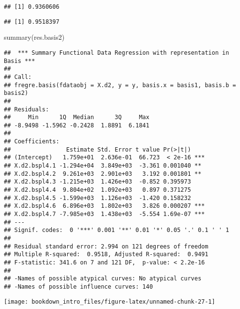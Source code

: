 \documentclass[
]{book}
\newenvironment{Shaded}{\begin{snugshade}}{\end{snugshade}}
\newcommand{\AttributeTok}[1]{\textcolor[rgb]{0.77,0.63,0.00}{#1}}
\newcommand{\DecValTok}[1]{\textcolor[rgb]{0.00,0.00,0.81}{#1}}
\newcommand{\FunctionTok}[1]{\textcolor[rgb]{0.00,0.00,0.00}{#1}}
\newcommand{\NormalTok}[1]{#1}
\newcommand{\SpecialCharTok}[1]{\textcolor[rgb]{0.00,0.00,0.00}{#1}}
\begin{document}
\begin{verbatim}
## [1] 0.9360606
\end{verbatim}

\begin{verbatim}
## [1] 0.9518397
\end{verbatim}

\begin{Shaded}
\begin{Highlighting}[]
\FunctionTok{summary}\NormalTok{(res.basis2)}
\end{Highlighting}
\end{Shaded}

\begin{verbatim}
##  *** Summary Functional Data Regression with representation in Basis *** 
## 
## Call:
## fregre.basis(fdataobj = X.d2, y = y, basis.x = basis1, basis.b = basis2)
## 
## Residuals:
##     Min      1Q  Median      3Q     Max 
## -8.9498 -1.5962 -0.2428  1.8891  6.1841 
## 
## Coefficients:
##                Estimate Std. Error t value Pr(>|t|)    
## (Intercept)   1.759e+01  2.636e-01  66.723  < 2e-16 ***
## X.d2.bspl4.1 -1.294e+04  3.849e+03  -3.361 0.001040 ** 
## X.d2.bspl4.2  9.261e+03  2.901e+03   3.192 0.001801 ** 
## X.d2.bspl4.3 -1.215e+03  1.426e+03  -0.852 0.395973    
## X.d2.bspl4.4  9.804e+02  1.092e+03   0.897 0.371275    
## X.d2.bspl4.5 -1.599e+03  1.126e+03  -1.420 0.158232    
## X.d2.bspl4.6  6.896e+03  1.802e+03   3.826 0.000207 ***
## X.d2.bspl4.7 -7.985e+03  1.438e+03  -5.554 1.69e-07 ***
## ---
## Signif. codes:  0 '***' 0.001 '**' 0.01 '*' 0.05 '.' 0.1 ' ' 1
## 
## Residual standard error: 2.994 on 121 degrees of freedom
## Multiple R-squared:  0.9518, Adjusted R-squared:  0.9491 
## F-statistic: 341.6 on 7 and 121 DF,  p-value: < 2.2e-16
## 
## -Names of possible atypical curves: No atypical curves 
## -Names of possible influence curves: 140
\end{verbatim}

\begin{center}\texttt{[image: bookdown\_intro\_files/figure-latex/unnamed-chunk-27-1]} \end{center}

\begin{Shaded}
\end{Shaded}
\end{document}
